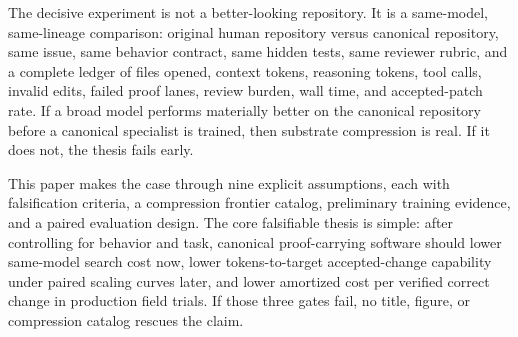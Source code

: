 The decisive experiment is not a better-looking repository. It is a same-model, same-lineage comparison: original human repository versus canonical repository, same issue, same behavior contract, same hidden tests, same reviewer rubric, and a complete ledger of files opened, context tokens, reasoning tokens, tool calls, invalid edits, failed proof lanes, review burden, wall time, and accepted-patch rate. If a broad model performs materially better on the canonical repository before a canonical specialist is trained, then substrate compression is real. If it does not, the thesis fails early.

This paper makes the case through nine explicit assumptions, each with falsification criteria, a compression frontier catalog, preliminary training evidence, and a paired evaluation design. The core falsifiable thesis is simple: after controlling for behavior and task, canonical proof-carrying software should lower same-model search cost now, lower tokens-to-target accepted-change capability under paired scaling curves later, and lower amortized cost per verified correct change in production field trials. If those three gates fail, no title, figure, or compression catalog rescues the claim.

